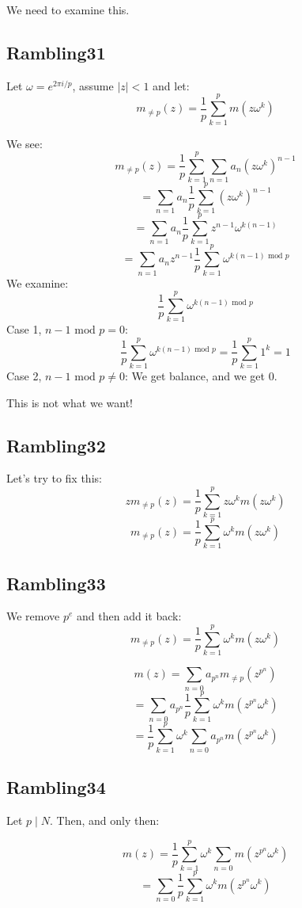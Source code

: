 \documentclass[a4paper]{amsart}
\begin{document}
We need to examine this. 



\subsection{Rambling31}
Let $\omega = e^{2\pi i/p}$, assume $|z| < 1$ and let:
$$m_{\ne p}(z) = \frac{1}{p} \sum_{k = 1}^p m(z \omega^k)$$

We see: 
$$m_{\ne p}(z) = \frac{1}{p} \sum_{k = 1}^p \sum_{n = 1} a_n (z \omega^k)^{n - 1}$$
$$ = \sum_{n = 1} a_n \frac{1}{p} \sum_{k = 1}^p (z \omega^k)^{n - 1}$$
$$ = \sum_{n = 1} a_n \frac{1}{p} \sum_{k = 1}^p z^{n - 1} \omega^{k(n - 1)}$$
$$ = \sum_{n = 1} a_n z^{n - 1} \frac{1}{p} \sum_{k = 1}^p \omega^{k(n - 1) \text{ mod } p}$$
We examine:
$$\frac{1}{p} \sum_{k = 1}^p \omega^{k(n - 1) \text{ mod } p}$$
Case 1, $n - 1 \text{ mod } p = 0$:
$$\frac{1}{p} \sum_{k = 1}^p \omega^{k(n - 1) \text{ mod } p} = \frac{1}{p} \sum_{k = 1}^p 1^{k} = 1$$
Case 2, $n - 1 \text{ mod } p \ne 0$:
We get balance, and we get $0$.

This is not what we want!


\subsection{Rambling32}
Let's try to fix this:
$$z m_{\ne p}(z) = \frac{1}{p} \sum_{k = 1}^p z \omega^k m(z \omega^k)$$
$$m_{\ne p}(z) = \frac{1}{p} \sum_{k = 1}^p \omega^k m(z \omega^k)$$



\subsection{Rambling33}
We remove $p^e$ and then add it back:
$$m_{\ne p}(z) = \frac{1}{p} \sum_{k = 1}^p \omega^k m(z \omega^k)$$

$$m(z) = \sum_{n = 0} a_{p^n} m_{\ne p}(z^{p^n})$$
$$ = \sum_{n = 0} a_{p^n} \frac{1}{p} \sum_{k = 1}^p \omega^k m(z^{p^n} \omega^k)$$
$$ = \frac{1}{p} \sum_{k = 1}^p \omega^k \sum_{n = 0} a_{p^n} m(z^{p^n} \omega^k)$$


\subsection{Rambling34}
Let $p \mid N$. Then, and only then:

$$m(z) = \frac{1}{p} \sum_{k = 1}^p \omega^k \sum_{n = 0} m(z^{p^n} \omega^k)$$
$$ = \sum_{n = 0} \frac{1}{p} \sum_{k = 1}^p \omega^k m(z^{p^n} \omega^k)$$
\end{document}
